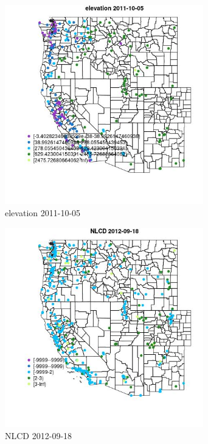 \begin{figure} 
\centering  
\includegraphics[width=0.77\textwidth]{Code_Outputs/ML_input_report_ML_input_PM25_Step5_part_d_de_duplicated_aves_ML_input_MapObselevation2011-10-05.jpg} 
\caption{\label{fig:ML_input_report_ML_input_PM25_Step5_part_d_de_duplicated_aves_ML_inputMapObselevation2011-10-05}elevation 2011-10-05} 
\end{figure} 
 

\begin{figure} 
\centering  
\includegraphics[width=0.77\textwidth]{Code_Outputs/ML_input_report_ML_input_PM25_Step5_part_d_de_duplicated_aves_ML_input_MapObsNLCD2012-09-18.jpg} 
\caption{\label{fig:ML_input_report_ML_input_PM25_Step5_part_d_de_duplicated_aves_ML_inputMapObsNLCD2012-09-18}NLCD 2012-09-18} 
\end{figure} 
 

